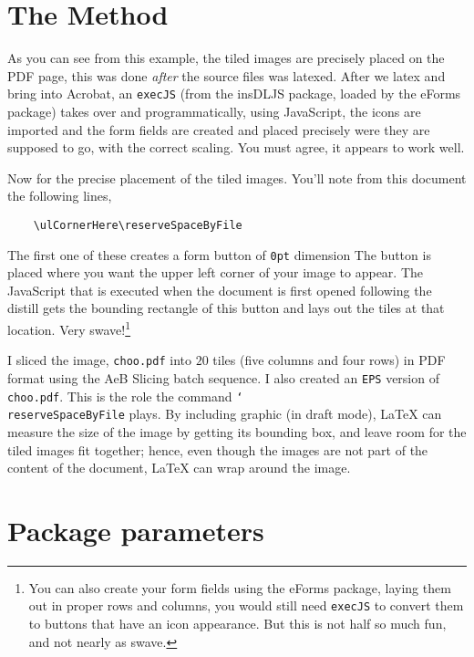 \documentclass{article}
\newcommand{\cs}[1]{\texttt{\char`\\#1}}
\begin{document}
\section{The Method}

As you can see from this example, the tiled images are precisely
placed on the PDF page, this was done \emph{after} the source files
was latexed. After we latex and bring into Acrobat, an
\texttt{execJS} (from the \textsf{insDLJS} package, loaded by the
\textsf{eForms} package) takes over and programmatically, using
JavaScript, the icons are imported and the form fields are created
and placed precisely were they are supposed to go, with the correct
scaling. You must agree, it appears to work well.

Now for the precise placement of the  tiled images. You'll note from
this document the following lines,
\begin{verbatim}
    \ulCornerHere\reserveSpaceByFile
\end{verbatim}
The first one of these creates a form button of \texttt{0pt}
dimension The button is placed where you want the upper left corner
of your image to appear.  The JavaScript that is executed when the
document is first opened following the distill gets the bounding
rectangle of this button and lays out the tiles at that
location. Very swave!\footnote{You can also create your form fields
using the \textsf{eForms} package, laying them out in proper rows
and columns, you would still need \texttt{execJS} to convert them to
buttons that have an icon appearance. But this is not half so much
fun, and not nearly as swave.}

I sliced the image, \texttt{choo.pdf} into $20$ tiles (five columns
and four rows)  in PDF format using the \textsf{AeB Slicing} batch
sequence. I also created an \texttt{EPS} version of
\texttt{choo.pdf}. This is the role the command
\cs{reserveSpaceByFile} plays. By including graphic (in draft mode),
{\LaTeX} can measure the size of the image by getting its bounding
box, and leave room for the tiled images fit together; hence, even
though the images are not part of the content of the document,
{\LaTeX} can wrap around the image.

\section{Package parameters}
\end{document}
